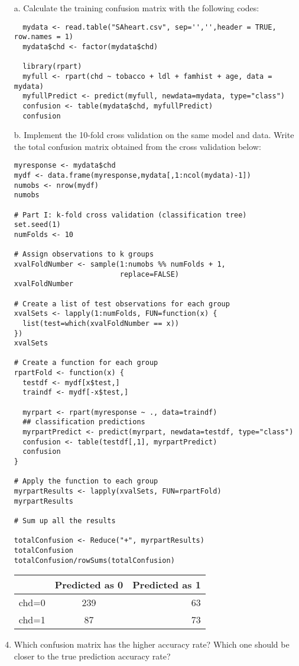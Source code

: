 \documentclass{article}
\begin{document}
\begin{enumerate}
  \item[a.]
    Calculate the training confusion matrix with the following codes:
\begin{verbatim}
  mydata <- read.table("SAheart.csv", sep='','',header = TRUE, row.names = 1)
  mydata$chd <- factor(mydata$chd)

  library(rpart)
  myfull <- rpart(chd ~ tobacco + ldl + famhist + age, data = mydata)
  myfullPredict <- predict(myfull, newdata=mydata, type="class")
  confusion <- table(mydata$chd, myfullPredict)
  confusion
\end{verbatim}

  \item[b.]
    Implement the 10-fold cross validation on the same model and data. Write the total confusion matrix obtained from the cross validation below:
\begin{verbatim}
myresponse <- mydata$chd
mydf <- data.frame(myresponse,mydata[,1:ncol(mydata)-1])
numobs <- nrow(mydf)
numobs

# Part I: k-fold cross validation (classification tree)
set.seed(1)
numFolds <- 10

# Assign observations to k groups
xvalFoldNumber <- sample(1:numobs %% numFolds + 1,
                         replace=FALSE)
xvalFoldNumber

# Create a list of test observations for each group
xvalSets <- lapply(1:numFolds, FUN=function(x) {
  list(test=which(xvalFoldNumber == x))
})
xvalSets

# Create a function for each group
rpartFold <- function(x) {
  testdf <- mydf[x$test,]
  traindf <- mydf[-x$test,]
  
  myrpart <- rpart(myresponse ~ ., data=traindf)
  ## classification predictions
  myrpartPredict <- predict(myrpart, newdata=testdf, type="class")
  confusion <- table(testdf[,1], myrpartPredict) 
  confusion
}

# Apply the function to each group
myrpartResults <- lapply(xvalSets, FUN=rpartFold)
myrpartResults

# Sum up all the results

totalConfusion <- Reduce("+", myrpartResults)
totalConfusion
totalConfusion/rowSums(totalConfusion)
\end{verbatim}
  \item[]
    \begin{tabular}{|l|c|r|}
      \hline
      & Predicted as 0 & Predicted as 1 \\
      \hline
      chd=0 & 239 & 63\\
      \hline
      chd=1 & 87 & 73\\
      \hline
    \end{tabular}
  \item
    Which confusion matrix has the higher accuracy rate? Which one should be closer to the true prediction accuracy rate?
\end{enumerate}
\end{document}
